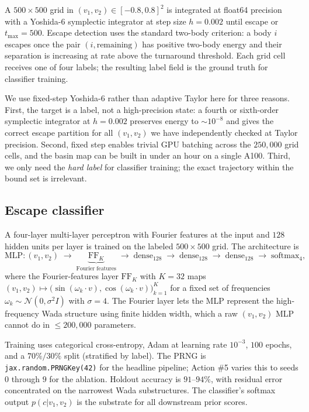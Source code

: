 \documentclass[11pt]{article}
\begin{document}
A $500\!\times\!500$ grid in $(v_1, v_2)\in[-0.8, 0.8]^2$ is integrated
at float64 precision with a Yoshida-$6$ symplectic integrator
\citep{Yoshida1990} at step size $h = 0.002$ until escape or
$t_{\max}=500$. Escape detection uses the standard two-body
criterion: a body $i$ escapes once the pair $(i,\text{remaining})$ has
positive two-body energy and their separation is increasing at rate
above the turnaround threshold. Each grid cell receives one of four
labels; the resulting label field is the ground truth for classifier
training.

We use fixed-step Yoshida-$6$ rather than adaptive Taylor here for
three reasons. First, the target is a label, not a high-precision
state: a fourth or sixth-order symplectic integrator at $h = 0.002$
preserves energy to $\sim\!10^{-8}$ and gives the correct escape
partition for all $(v_1, v_2)$ we have independently checked at
Taylor precision. Second, fixed step enables trivial GPU batching
across the $250{,}000$ grid cells, and the basin map can be built in
under an hour on a single A100. Third, we only need the \emph{hard
label} for classifier training; the exact trajectory within the
bound set is irrelevant.

\subsection{Escape classifier}

A four-layer multi-layer perceptron with Fourier features at the
input and $128$ hidden units per layer is trained on the labeled
$500\!\times\!500$ grid. The architecture is
\begin{equation}
  \text{MLP}: (v_1, v_2) \;\to\; \underbrace{\text{FF}_{K}}_{\text{Fourier features}} \;\to\;
     \text{dense}_{128} \;\to\; \text{dense}_{128} \;\to\;
     \text{dense}_{128} \;\to\; \text{softmax}_4,
  \label{eq:mlp}
\end{equation}
where the Fourier-features layer $\text{FF}_K$ with $K=32$ maps
$(v_1, v_2) \mapsto \big(\sin(\omega_k \cdot v), \cos(\omega_k \cdot v)\big)_{k=1}^{K}$
for a fixed set of frequencies $\omega_k \sim \mathcal{N}(0, \sigma^2 I)$
with $\sigma = 4$. The Fourier layer lets the MLP represent the
high-frequency Wada structure using finite hidden width, which a raw
$(v_1, v_2)$ MLP cannot do in $\le\!200{,}000$ parameters.

Training uses categorical cross-entropy, Adam at learning rate
$10^{-3}$, $100$ epochs, and a $70\%/30\%$ split (stratified by
label). The PRNG is \texttt{jax.random.PRNGKey(42)} for the
headline pipeline; Action \#5 varies this to seeds $0$ through $9$
for the ablation. Holdout accuracy is $91$--$94\%$, with residual error
concentrated on the narrowest Wada substructures. The classifier's
softmax output $p(c | v_1, v_2)$ is the substrate for all downstream
prior scores.
\end{document}

